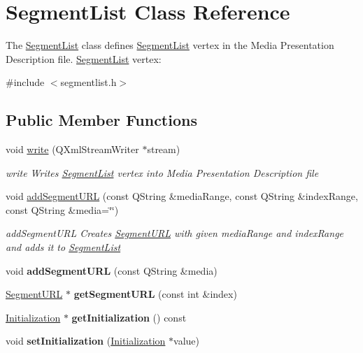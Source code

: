 \hypertarget{class_segment_list}{\section{Segment\-List Class Reference}
\label{class_segment_list}
}


The \hyperlink{class_segment_list}{Segment\-List} class defines \hyperlink{class_segment_list}{Segment\-List} vertex in the Media Presentation Description file. \hyperlink{class_segment_list}{Segment\-List} vertex\-:  




{\ttfamily \#include $<$segmentlist.\-h$>$}

\subsection*{Public Member Functions}
\begin{DoxyCompactItemize}
\item 
void \hyperlink{class_segment_list_a81ea7f0f3e64e12b5822ce42ce1df599}{write} (Q\-Xml\-Stream\-Writer $\ast$stream)
\begin{DoxyCompactList}\small\item\em write Writes \hyperlink{class_segment_list}{Segment\-List} vertex into Media Presentation Description file \end{DoxyCompactList}\item 
void \hyperlink{class_segment_list_a67bf32fd52a7ad03042d2273727fffea}{add\-Segment\-U\-R\-L} (const Q\-String \&media\-Range, const Q\-String \&index\-Range, const Q\-String \&media=\char`\"{}\char`\"{})
\begin{DoxyCompactList}\small\item\em add\-Segment\-U\-R\-L Creates \hyperlink{class_segment_u_r_l}{Segment\-U\-R\-L} with given media\-Range and index\-Range and adds it to \hyperlink{class_segment_list}{Segment\-List} \end{DoxyCompactList}\item 
\hypertarget{class_segment_list_a496d545a0f79656894c24214314c770d}{void {\bfseries add\-Segment\-U\-R\-L} (const Q\-String \&media)}\label{class_segment_list_a496d545a0f79656894c24214314c770d}

\item 
\hypertarget{class_segment_list_ad04de1dd66218c87cea21a024fc77386}{\hyperlink{class_segment_u_r_l}{Segment\-U\-R\-L} $\ast$ {\bfseries get\-Segment\-U\-R\-L} (const int \&index)}\label{class_segment_list_ad04de1dd66218c87cea21a024fc77386}

\item 
\hypertarget{class_segment_list_af264f50e65d1e94e175d62cf304583d4}{\hyperlink{class_initialization}{Initialization} $\ast$ {\bfseries get\-Initialization} () const }\label{class_segment_list_af264f50e65d1e94e175d62cf304583d4}

\item 
\hypertarget{class_segment_list_a788081b6b66468f8a727565bab53e630}{void {\bfseries set\-Initialization} (\hyperlink{class_initialization}{Initialization} $\ast$value)}\label{class_segment_list_a788081b6b66468f8a727565bab53e630}

\end{DoxyCompactItemize}


